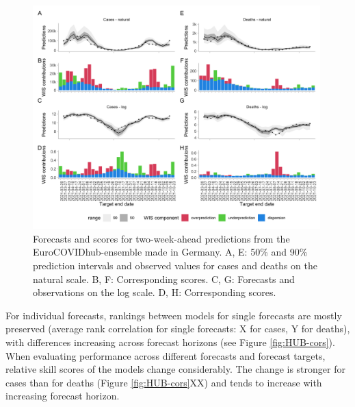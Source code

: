 \documentclass{article}
\begin{document}
\begin{figure}[h!]
    \centering
    \includegraphics[width=0.99\textwidth]{output/figures/HUB-model-comparison-ensemble.png}
    \caption{
    Forecasts and scores for two-week-ahead predictions from the EuroCOVIDhub-ensemble made in Germany. A, E: 50\% and 90\% prediction intervals and observed values for cases and deaths on the natural scale. B, F: Corresponding scores. C, G: Forecasts and observations on the log scale. D, H: Corresponding scores. 
    }
    \label{fig:HUB-model-comparison-ensemble}
\end{figure}


For individual forecasts, rankings between models for single forecasts are mostly preserved (average rank correlation for single forecasts: X for cases, Y for deaths), with differences increasing across forecast horizons (see Figure \ref{fig:HUB-cors}). When evaluating performance across different forecasts and forecast targets, relative skill scores of the models change considerably. The change is stronger for cases than for deaths (Figure \ref{fig:HUB-cors}XX) and tends to increase with increasing forecast horizon. 
\end{document}
